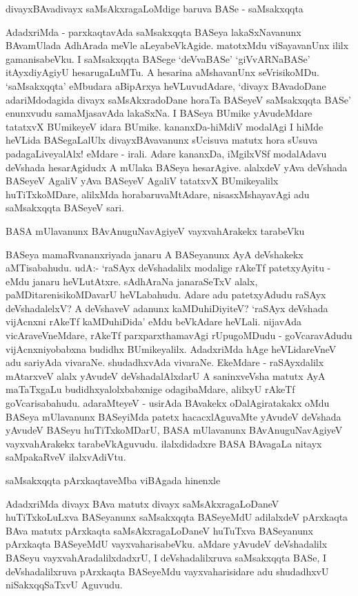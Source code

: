 divayxBAvadivayx saMsAkxragaLoMdige baruva BASe - saMsakxqqta

AdadxriMda - parxkaqtavAda saMsakxqqta BASeya lakaSxNavanunx BAvamUlada AdhArada meVle aLeyabeVkAgide. matotxMdu viSayavanUnx ililx gamanisabeVku. I saMsakxqqta BASege `deVvaBASe' `giVvARNaBASe' itAyxdiyAgiyU hesarugaLuMTu. A hesarina aMshavanUnx seVrisikoMDu. `saMsakxqqta' eMbudara aBipArxya heVLuvudAdare, `divayx BAvadoDane adariMdodagida divayx saMsAkxradoDane horaTa BASeyeV saMsakxqqta BASe' enunxvudu samaMjasavAda lakaSxNa. I BASeya BUmike yAvudeMdare tatatxvX BUmikeyeV idara BUmike. kananxDa-hiMdiV modalAgi I hiMde heVLida BASegaLalUlx divayxBAvavanunx sUcisuva matutx hora sUsuva padagaLiveyalAlx! eMdare - irali. Adare kananxDa, iMgilxVSf modalAdavu deVshada hesarAgidudx A mUlaka BASeya hesarAgive. alalxdeV yAva deVshada BASeyeV AgaliV yAva BASeyeV AgaliV tatatxvX BUmikeyalilx huTiTxkoMDare, alilxMda horabaruvaMtAdare, nisasxMshayavAgi adu saMsakxqqta BASeyeV sari.

BASA mUlavanunx BAvAnuguNavAgiyeV vayxvahArakekx tarabeVku

BASeya mamaRvananxriyada janaru A BASeyanunx AyA deVshakekx aMTisabahudu. udA:- `raSAyx deVshadalilx modalige rAkeTf patetxyAyitu - eMdu janaru heVLutAtxre. sAdhAraNa janaraSeTxV alalx, paMDitarenisikoMDavarU heVLabahudu. Adare adu patetxyAdudu raSAyx deVshadalelxV? A deVshaveV adanunx kaMDuhiDiyiteV? `raSAyx deVshada vijAcnxni rAkeTf kaMDuhiDida' eMdu beVkAdare heVLali. nijavAda vicAraveVneMdare, rAkeTf parxparxthamavAgi rUpugoMDudu - goVcaravAdudu vijAcnxniyobabxna budidhx BUmikeyalilx. AdadxriMda hAge heVLidareVneV adu sariyAda vivaraNe. shudadhxvAda vivaraNe. EkeMdare - raSAyxdalilx mAtarxveV alalx yAvudeV deVshadalAlxdarU A saninxveVsha matutx AyA maTaTxgaLu budidhxyalolxbabxnige odagibaMdare, alilxyU rAkeTf goVcarisabahudu. adaraMteyeV - usirAda BAvakekx oDalAgiratakakx oMdu BASeya mUlavanunx BASeyiMda patetx hacacxlAguvaMte yAvudeV deVshada yAvudeV BASeyu huTiTxkoMDarU, BASA mUlavanunx BAvAnuguNavAgiyeV vayxvahArakekx tarabeVkAguvudu. ilalxdidadxre BASA BAvagaLa nitayx saMpakaRveV ilalxvAdiVtu.

saMsakxqqta pArxkaqtaveMba viBAgada hinenxle

AdadxriMda divayx BAva matutx divayx saMsAkxragaLoDaneV huTiTxkoLuLxva BASeyanunx saMsakxqqta BASeyeMdU adilalxdeV pArxkaqta BAva matutx pArxkaqta saMsAkxragaLoDaneV huTuTxva BASeyanunx pArxkaqta BASeyeMdU vayxvaharisabeVku. aMdare yAvudeV deVshadalilx BASeyu vayxvahAradalilxdadxrU, I deVshadalilxruva saMsakxqqta BASe, I deVshadalilxruva pArxkaqta BASeyeMdu vayxvaharisidare adu shudadhxvU niSakxqqSaTxvU Aguvudu.

